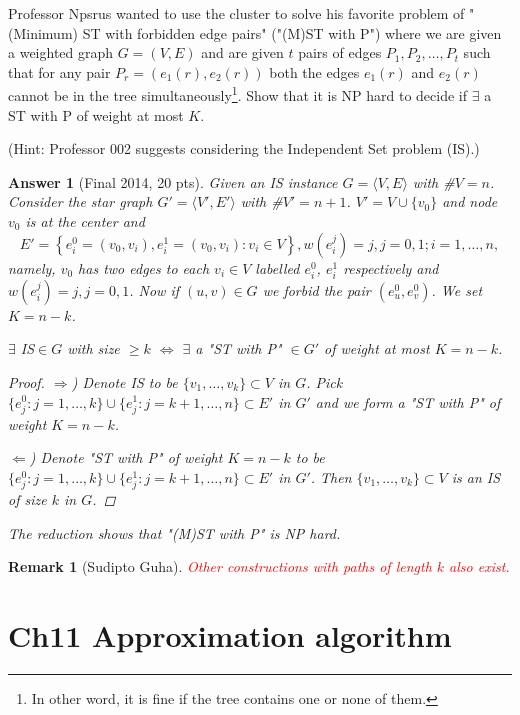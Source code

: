 \documentclass[11pt]{article}
\theoremstyle{numberplain}
\theoremstyle{nonumberplain}
\newtheorem{proof}{Proof}
\newtheorem{rem}{Remark}
\newtheorem{ans}{Answer}
\newcommand{\0}{{\mathbf{0}}}
\begin{document}
\begin{ques}
Professor Npsrus wanted to use the cluster to solve his favorite problem
of "(Minimum) ST with forbidden edge pairs" ("(M)ST with P") where we are given a weighted graph
$G = (V,E)$ and are given $t$ pairs of edges $P_1, P_2,\ldots, P_t$ such that for any pair $P_r = (e_1(r), e_2(r))$
both the edges $e_1(r)$ and $e_2(r)$ cannot be in the tree simultaneously\footnote{In other word, it is fine if the tree contains one or none of them.}. Show that it is NP hard to decide if $\exists$ a ST
with P of weight at most $K$.

 (Hint: Professor 002 suggests considering the Independent Set problem (IS).)
\end{ques}

\begin{ans}[Final 2014, 20 pts] 
Given an IS instance $G=\langle V,E\rangle$ with \#$V=n$. Consider the star graph $G'=\langle V',E'\rangle$ with \#$V'=n+1$. $V'=V\cup\{v_0\}$ and node $v_0$ is at the center and 
$$E'=\left\{e_i^0=(v_0,v_i), e_i^1=(v_0,v_i):v_i\in V \right\}, w(e_i^j)=j,j=0,1;i=1,\ldots, n,$$
namely, $v_0$ has two edges to each $v_i\in V$ labelled $e_i^0$, $e_i^1$ respectively and $w(e_i^j)=j,j=0,1$. Now if $(u, v)\in G$ we forbid the pair $(e_u^0, e_v^0)$. We set $K = n - k$.



\begin{claim}
$\exists$ IS$\in G$ with size $\geq k$ $\Leftrightarrow$ $\exists$ a "ST with P" $\in G'$ of weight at most $K=n-k$.
\end{claim}
\begin{proof}
$\Rightarrow$) Denote IS to be $\{v_1,\ldots,v_k\}\subset V$ in $G$. Pick $\{e_j^0:j=1,\ldots,k\}\cup \{e_j^1:j=k+1,\ldots,n\}\subset E'$ in $G'$ and we form a "ST with P" of weight $K=n-k$.
 
$\Leftarrow$) Denote "ST with P" of weight $K=n-k$ to be $\{e_j^0:j=1,\ldots,k\}\cup \{e_j^1:j=k+1,\ldots,n\}\subset E'$ in $G'$. Then $\{v_1,\ldots,v_k\}\subset V$ is an IS of size $k$ in $G$.
\end{proof}
The reduction shows that "(M)ST with P" is NP hard.
\end{ans}
\begin{rem}[Sudipto Guha] \textcolor{red}{Other constructions with paths of length $k$ also exist.}
\end{rem}


\section{Ch11 Approximation algorithm}
\end{document}
